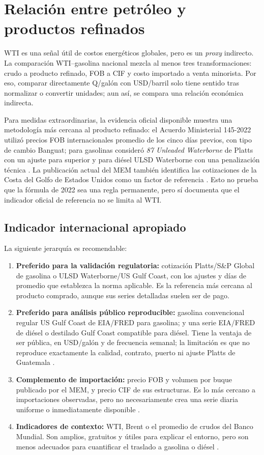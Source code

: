\documentclass[11pt,letterpaper]{article}
\begin{document}
\section{Relación entre petróleo y productos refinados}
WTI es una señal útil de costos energéticos globales, pero es un \emph{proxy} indirecto. La comparación WTI--gasolina nacional mezcla al menos tres transformaciones: crudo a producto refinado, FOB a CIF y costo importado a venta minorista. Por eso, comparar directamente Q/galón con USD/barril solo tiene sentido tras normalizar o convertir unidades; aun así, se compara una relación económica indirecta.

Para medidas extraordinarias, la evidencia oficial disponible muestra una metodología más cercana al producto refinado: el Acuerdo Ministerial 145-2022 utilizó precios FOB internacionales promedio de los cinco días previos, con tipo de cambio Banguat; para gasolinas consideró \emph{87 Unleaded Waterborne} de Platts con un ajuste para superior y para diésel ULSD Waterborne con una penalización técnica \parencite{memAcuerdo1452022}. La publicación actual del MEM también identifica las cotizaciones de la Costa del Golfo de Estados Unidos como un factor de referencia \parencite{memLatam2026}. Esto no prueba que la fórmula de 2022 sea una regla permanente, pero sí documenta que el indicador oficial de referencia no se limita al WTI.

\subsection{Indicador internacional apropiado}
La siguiente jerarquía es recomendable:
\begin{enumerate}
  \item \textbf{Preferido para la validación regulatoria:} cotización Platts/S\&P Global de gasolina o ULSD Waterborne/US Gulf Coast, con los ajustes y días de promedio que establezca la norma aplicable. Es la referencia más cercana al producto comprado, aunque sus series detalladas suelen ser de pago.
  \item \textbf{Preferido para análisis público reproducible:} gasolina convencional regular US Gulf Coast de EIA/FRED para gasolina; y una serie EIA/FRED de diésel o destilado Gulf Coast compatible para diésel. Tiene la ventaja de ser pública, en USD/galón y de frecuencia semanal; la limitación es que no reproduce exactamente la calidad, contrato, puerto ni ajuste Platts de Guatemala \parencite{fredGasolinaGulf2026}.
  \item \textbf{Complemento de importación:} precio FOB y volumen por buque publicado por el MEM, y precio CIF de sus estructuras. Es lo más cercano a importaciones observadas, pero no necesariamente crea una serie diaria uniforme o inmediatamente disponible \parencite{memPrecios2026}.
  \item \textbf{Indicadores de contexto:} WTI, Brent o el promedio de crudos del Banco Mundial. Son amplios, gratuitos y útiles para explicar el entorno, pero son menos adecuados para cuantificar el traslado a gasolina o diésel \parencite{eiaApi2026,worldBankPinkSheet2026}.
\end{enumerate}
\end{document}
